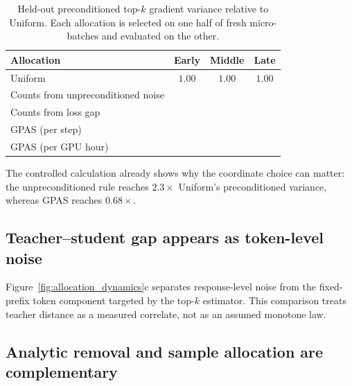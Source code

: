 \begin{table}[H]
\centering
\small
\caption{Held-out preconditioned top-$k$ gradient variance relative to Uniform.
Each allocation is selected on one half of fresh micro-batches and evaluated
on the other. }
\label{tab:heldout_variance}
\begin{tabular}{lccc}
\toprule
Allocation & Early & Middle & Late \\
\midrule
Uniform & $1.00$ & $1.00$ & $1.00$ \\
Counts from unpreconditioned noise & & & \\
Counts from loss gap & & & \\
GPAS (per step) & & & \\
GPAS (per GPU hour) & & & \\
\bottomrule
\end{tabular}
\end{table}

 The controlled calculation already shows why the
coordinate choice can matter: the unpreconditioned rule reaches
$2.3\times$ Uniform's preconditioned variance, whereas GPAS reaches
$0.68\times$.

\subsection{Teacher--student gap appears as token-level noise}

Figure~\ref{fig:allocation_dynamics}c separates response-level noise from the
fixed-prefix token component targeted by the top-$k$ estimator.  This comparison treats
teacher distance as a measured correlate, not as an assumed monotone law.

\subsection{Analytic removal and sample allocation are complementary}

